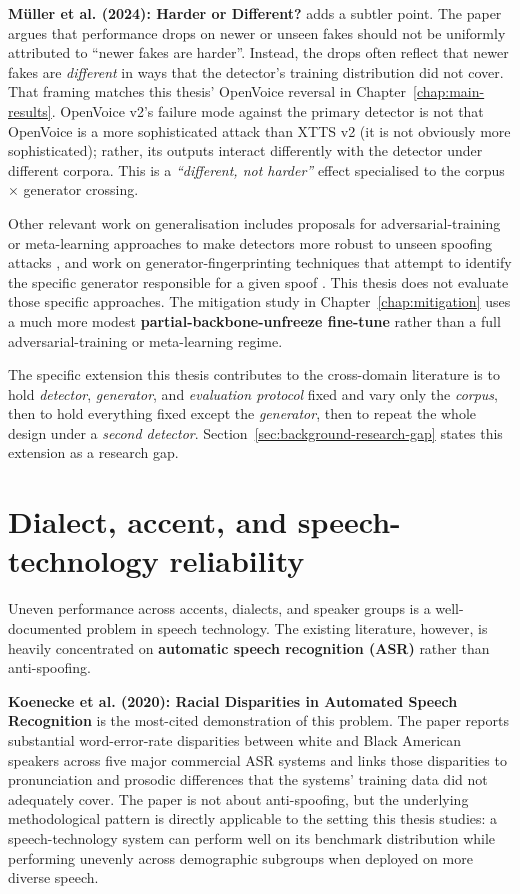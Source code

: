 \textbf{Müller et al. (2024): Harder or Different?}
\cite{Muller2024_HarderDifferent} adds a subtler point. The paper
argues that performance drops on newer or unseen fakes should not
be uniformly attributed to ``newer fakes are harder''. Instead,
the drops often reflect that newer fakes are \emph{different} in
ways that the detector's training distribution did not cover.
That framing matches this thesis' OpenVoice reversal in
Chapter~\ref{chap:main-results}. OpenVoice v2's failure mode
against the primary detector is not that OpenVoice is a more
sophisticated attack than XTTS v2 (it is not obviously more
sophisticated); rather, its outputs interact differently with the
detector under different corpora. This is a
\emph{``different, not harder''} effect specialised to the
corpus $\times$ generator crossing.

Other relevant work on generalisation includes proposals for
adversarial-training or meta-learning approaches to make
detectors more robust to unseen spoofing attacks
\cite{WangHansen2024_MetaRobustness}, and work on
generator-fingerprinting techniques that attempt to identify the
specific generator responsible for a given spoof
\cite{Gasenzer2023_GeneralizingDeepAudioFake}. This thesis does
not evaluate those specific approaches. The mitigation study in
Chapter~\ref{chap:mitigation} uses a much more modest
\textbf{partial-backbone-unfreeze fine-tune} rather than a full
adversarial-training or meta-learning regime.

The specific extension this thesis contributes to the
cross-domain literature is to hold \emph{detector},
\emph{generator}, and \emph{evaluation protocol} fixed and vary
only the \emph{corpus}, then to hold everything fixed except the
\emph{generator}, then to repeat the whole design under a
\emph{second detector}. Section~\ref{sec:background-research-gap}
states this extension as a research gap.


\section{Dialect, accent, and speech-technology reliability}
\label{sec:background-dialect}

Uneven performance across accents, dialects, and speaker groups
is a well-documented problem in speech technology. The existing
literature, however, is heavily concentrated on \textbf{automatic
speech recognition (ASR)} rather than anti-spoofing.

\textbf{Koenecke et al. (2020): Racial Disparities in Automated
Speech Recognition} \cite{Koenecke2020_ASRDisparities} is the
most-cited demonstration of this problem. The paper reports
substantial word-error-rate disparities between white and Black
American speakers across five major commercial ASR systems and
links those disparities to pronunciation and prosodic differences
that the systems' training data did not adequately cover. The
paper is not about anti-spoofing, but the underlying
methodological pattern is directly applicable to the setting this
thesis studies: a speech-technology system can perform well on
its benchmark distribution while performing unevenly across
demographic subgroups when deployed on more diverse speech.

